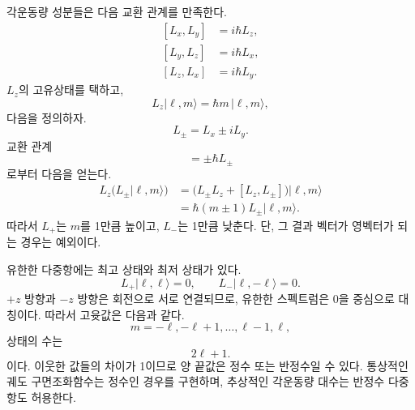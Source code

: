 각운동량 성분들은 다음 교환 관계를 만족한다.
\begin{equation}
\begin{aligned}
[L_x,L_y]&=i\hbar L_z,\\
[L_y,L_z]&=i\hbar L_x,\\
[L_z,L_x]&=i\hbar L_y.
\end{aligned}
\end{equation}
\(L_z\)의 고유상태를 택하고,
\begin{equation}
L_z|\ell,m\rangle=\hbar m\,|\ell,m\rangle,
\end{equation}
다음을 정의하자.
\begin{equation}
L_\pm=L_x\pm iL_y.
\end{equation}
교환 관계
\begin{equation}
[L_z,L_\pm]=\pm\hbar L_\pm
\end{equation}
로부터 다음을 얻는다.
\begin{align}
L_z\bigl(L_\pm|\ell,m\rangle\bigr)
&=\bigl(L_\pm L_z+[L_z,L_\pm]\bigr)|\ell,m\rangle \\
&=\hbar(m\pm1)L_\pm|\ell,m\rangle.
\end{align}
따라서 \(L_+\)는 \(m\)를 1만큼 높이고, \(L_-\)는 1만큼 낮춘다. 단, 그 결과 벡터가 영벡터가 되는 경우는 예외이다.

유한한 다중항에는 최고 상태와 최저 상태가 있다.
\begin{equation}
L_+|\ell,\ell\rangle=0,
\qquad
L_-|\ell,-\ell\rangle=0.
\end{equation}
\(+z\) 방향과 \(-z\) 방향은 회전으로 서로 연결되므로, 유한한 스펙트럼은 0을 중심으로 대칭이다. 따라서 고윳값은 다음과 같다.
\begin{equation}
m=-\ell,-\ell+1,\ldots,\ell-1,\ell,
\end{equation}
상태의 수는
\begin{equation}
2\ell+1.
\end{equation}
이다. 이웃한 값들의 차이가 1이므로 양 끝값은 정수 또는 반정수일 수 있다. 통상적인 궤도 구면조화함수는 정수인 경우를 구현하며, 추상적인 각운동량 대수는 반정수 다중항도 허용한다.

\begin{classroomqa}\end{classroomqa}

